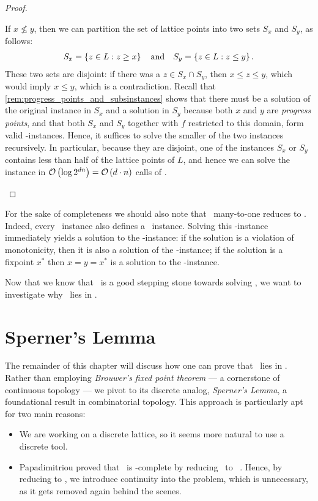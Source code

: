 \begin{proof}
	\begin{case}{3}
		If $x \not\leq y$, then we can partition the set of lattice points into two sets $S_x$ and $S_y$, as follows:
		\begin{align*}
			S_x = \left\{z \in L : z \geq x\right\} \quad \text{and} \quad S_y = \left\{z \in L : z \leq y\right\}.
		\end{align*}
		These two sets are disjoint: if there was a $z \in S_x \cap S_y$, then $x \leq z \leq y$, which would imply $x \leq y$, which is a contradiction. Recall that \cref{rem:progress_points_and_subsinstances} shows that there must be a solution of the original instance in $S_x$ and a solution in $S_y$ because both $x$ and $y$ are \emph{progress points}, and that both $S_x$ and $S_y$ together with $f$ restricted to this domain, form valid \Tarski-instances. Hence, it suffices to solve the smaller of the two instances recursively. In particular, because they are disjoint, one of the instances $S_x$ or $S_y$ contains less than half of the lattice points of $L$, and hence we can solve the instance in $\mathcal{O}\left(\log{2^{dn}}\right) = \mathcal{O}\left(d \cdot n\right)$ calls of \Tarskistar.
	\end{case}
\end{proof}

For the sake of completeness we should also note that \Tarskistar\ many-to-one reduces to \Tarski. Indeed, every \Tarskistar\ instance also defines a \Tarski\ instance. Solving this \Tarski-instance immediately yields a solution to the \Tarskistar-instance: if the solution is a violation of monotonicity, then it is also a solution of the \Tarski-instance; if the solution is a fixpoint $x^*$ then $x=y=x^*$ is a solution to the \Tarskistar-instance.

Now that we know that \Tarskistar\ is a good stepping stone towards solving \Tarski, we want to investigate why \Tarskistar\ lies in \PPAD\@.

\section{Sperner's Lemma}

The remainder of this chapter will discuss how one can prove that \Tarskistar\ lies in \PPAD\@. Rather than employing \textit{Brouwer's fixed point theorem} --- a cornerstone of continuous topology --- we pivot to its discrete analog, \textit{Sperner's Lemma}, a foundational result in combinatorial topology. This approach is particularly apt for two main reasons:
\begin{itemize}
	\item We are working on a discrete lattice, so it seems more natural to use a discrete tool.
	\item Papadimitriou proved that \Brouwer\ is \PPAD-complete by reducing \Brouwer\ to \Sperner\ . Hence, by reducing to \Brouwer, we introduce continuity into the problem, which is unnecessary, as it gets removed again behind the scenes.
\end{itemize}

